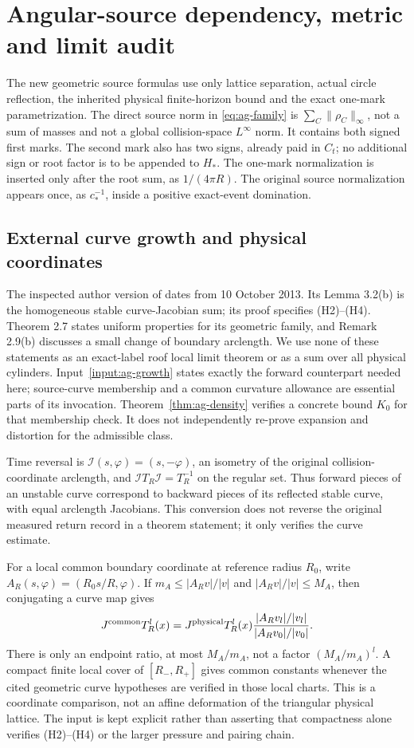 \section{Angular-source dependency, metric and limit audit}
\label{app:ag-audit}
The new geometric source formulas use only lattice separation,
actual circle reflection, the inherited physical finite-horizon
bound and the exact one-mark parametrization. The direct source
norm in \eqref{eq:ag-family} is
$\sum_C\|\rho_C\|_\infty$, not a sum of masses and not a global
collision-space $L^\infty$ norm. It contains both signed first marks.
The second mark also has two signs, already paid in $C_t$; no
additional sign or root factor is to be appended to $H_*$. The
one-mark normalization is inserted only after the root sum, as
$1/(4\pi R)$. The original source normalization appears once,
as $c_*^{-1}$, inside a positive exact-event domination.

\subsection*{External curve growth and physical coordinates}
The inspected author version of \cite{DZUniform} dates from
10 October 2013. Its Lemma 3.2(b) is the homogeneous stable
curve-Jacobian sum; its proof specifies (H2)--(H4).
Theorem 2.7 states uniform properties for its geometric family,
and Remark 2.9(b) discusses a small change of boundary arclength.
We use none of these statements as an exact-label roof local limit
theorem or as a sum over all physical cylinders. Input~\ref{input:ag-growth}
states exactly the forward counterpart needed here; source-curve
membership and a common curvature allowance are essential parts
of its invocation. Theorem~\ref{thm:ag-density} verifies a concrete
bound $K_0$ for that membership check. It does not independently
re-prove expansion and distortion for the admissible class.

Time reversal is $\mathcal I(s,\varphi)=(s,-\varphi)$, an isometry
of the original collision-coordinate arclength, and
$\mathcal I T_R\mathcal I=T_R^{-1}$ on the regular set. Thus
forward pieces of an unstable curve correspond to backward pieces
of its reflected stable curve, with equal arclength Jacobians.
This conversion does not reverse the original measured return
record in a theorem statement; it only verifies the curve estimate.

For a local common boundary coordinate at reference radius $R_0$,
write $A_R(s,\varphi)=(R_0s/R,\varphi)$. If $m_A\le|A_Rv|/|v|
$ and $|A_Rv|/|v|\le M_A$, then conjugating a curve map gives
\[
 J^{\rm common}T_R^l(x)=J^{\rm physical}T_R^l(x)
       \frac{|A_R v_l|/|v_l|}{|A_R v_0|/|v_0|}.
\]
There is only an endpoint ratio, at most $M_A/m_A$, not a factor
$(M_A/m_A)^l$. A compact finite local cover of $[R_-,R_+]$ gives
common constants whenever the cited geometric curve hypotheses
are verified in those local charts. This is a coordinate comparison,
not an affine deformation of the triangular physical lattice. The
input is kept explicit rather than asserting that compactness
alone verifies (H2)--(H4) or the larger pressure and pairing chain.


